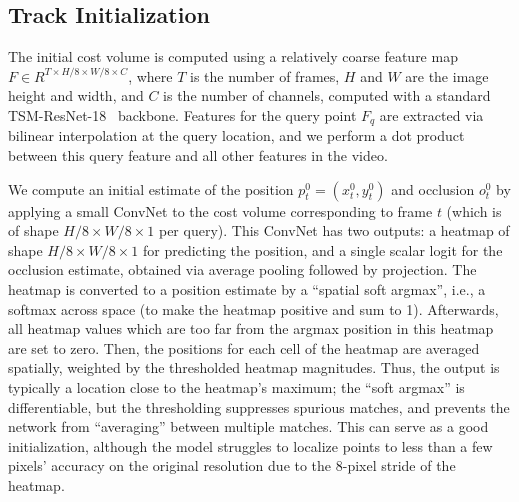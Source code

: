 \documentclass[10pt,twocolumn,letterpaper]{article}
\begin{document}
\subsection{Track Initialization}
The initial cost volume is computed using a relatively coarse  
feature map $F \in R^{T\times H/8\times W/8 \times C}$, where $T$ is the number of frames, $H$ and $W$ are the image height and width, and $C$ is the number of channels, computed with a standard TSM-ResNet-18~\cite{lin2020tsm} backbone.  
Features for the query point $F_q$ are extracted via bilinear interpolation at the query location, and we perform a dot product between this query feature and all other features in the video.

We compute an initial estimate of the position $p^{0}_t=(x^{0}_{t},y^{0}_{t})$ and occlusion $o^{0}_t$ by applying a small ConvNet to the cost volume corresponding to frame $t$ (which is of shape $H/8\times W/8 \times 1$ per query).  This ConvNet has two outputs: a heatmap of shape $H/8\times W/8 \times 1$ for predicting the position, and a single scalar logit for the occlusion estimate, obtained via average pooling followed by projection.  The heatmap is converted to a position estimate by a ``spatial soft argmax'', i.e., a softmax across space (to make the heatmap positive and sum to 1). Afterwards, all heatmap values which are too far from the argmax position in this heatmap are set to zero. Then, the positions for each cell of the heatmap are averaged spatially, weighted by the thresholded heatmap magnitudes.  Thus, the output is typically a location close to the heatmap's maximum; the ``soft argmax'' is differentiable, but the thresholding suppresses spurious matches, and prevents the network from ``averaging'' between multiple matches.  This can serve as a good initialization, although the model struggles to localize points to less than a few pixels' accuracy on the original resolution due to the 8-pixel stride of the heatmap.
\end{document}
